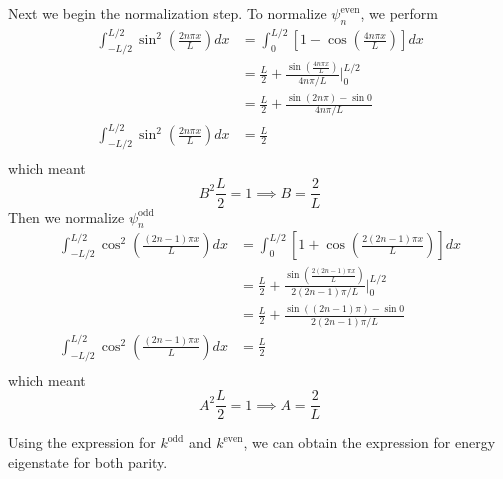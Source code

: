 \documentclass[../../../main.tex]{subfiles}
\begin{document}
Next we begin the normalization step.
To normalize $\psi_n^{\text{even}}$, we perform
\begin{align*}
    \int_{-L/2}^{L/2} \sin^2\left(\frac{2 n \pi x}{L}\right) dx & =  \int_0^{L/2} \left[1 - \cos\left(\frac{4 n \pi x}{L}\right)\right] dx                 \\
                                                                & = \frac{L }{2 }+ \frac{\sin\left(\frac{4 n \pi x}{L}\right)}{4 n \pi / L} \Bigg|_0^{L/2} \\
                                                                & = \frac{L }{2 }+\frac{\sin(2 n \pi) - \sin 0}{4 n \pi / L}                               \\
    \int_{-L/2}^{L/2} \sin^2\left(\frac{2 n \pi x}{L}\right) dx & =\frac{L }{2}                                                                            \\
\end{align*}
which meant
\begin{equation*}
    B^2 \frac{L }{2 }=1\implies B=\frac{2 }{L}
\end{equation*}
Then we normalize $\psi_n^{\text{odd}}$
\begin{align*}
    \int_{-L/2}^{L/2} \cos^2\left(\frac{(2n-1) \pi x}{L}\right) dx & =  \int_0^{L/2} \left[1 + \cos\left(\frac{2 (2n-1) \pi x}{L}\right)\right] dx                   \\
                                                                   & = \frac{L }{2 }+\frac{\sin\left(\frac{2 (2n-1) \pi x}{L}\right)}{2(2n-1)\pi / L} \Bigg|_0^{L/2} \\
                                                                   & = \frac{L }{2 }+ \frac{\sin((2n-1)\pi)-\sin0}{2(2n-1)\pi / L}                                   \\
    \int_{-L/2}^{L/2} \cos^2\left(\frac{(2n-1) \pi x}{L}\right) dx & = \frac{L }{2 }                                                                                 \\
\end{align*}
which meant
\begin{equation*}
    A^2 \frac{L }{2 }=1\implies A=\frac{2 }{L}
\end{equation*}

Using the expression for $k^{\text{odd}}$ and $k^{\text{even}}$, we can obtain the expression for energy eigenstate for both parity.
\end{document}
